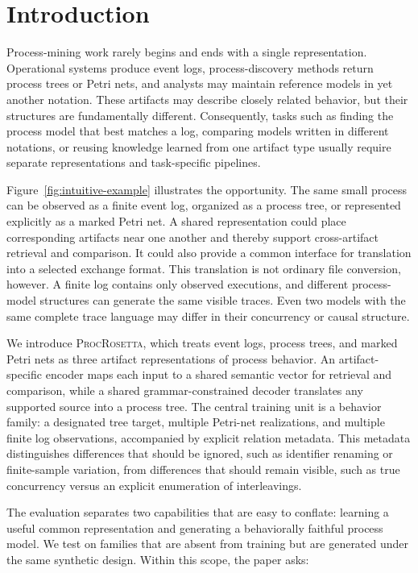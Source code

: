 \documentclass[pdflatex,sn-basic]{sn-jnl}
\newcommand{\model}{\textsc{ProcRosetta}\xspace}
\begin{document}
\section{Introduction}\label{sec:introduction}

Process-mining work rarely begins and ends with a single representation. Operational systems produce event logs, process-discovery methods return process trees or Petri nets, and analysts may maintain reference models in yet another notation. These artifacts may describe closely related behavior, but their structures are fundamentally different. Consequently, tasks such as finding the process model that best matches a log, comparing models written in different notations, or reusing knowledge learned from one artifact type usually require separate representations and task-specific pipelines.

Figure~\ref{fig:intuitive-example} illustrates the opportunity. The same small process can be observed as a finite event log, organized as a process tree, or represented explicitly as a marked Petri net. A shared representation could place corresponding artifacts near one another and thereby support cross-artifact retrieval and comparison. It could also provide a common interface for translation into a selected exchange format. This translation is not ordinary file conversion, however. A finite log contains only observed executions, and different process-model structures can generate the same visible traces. Even two models with the same complete trace language may differ in their concurrency or causal structure.



We introduce \model, which treats event logs, process trees, and marked Petri nets as three artifact representations of process behavior. An artifact-specific encoder maps each input to a shared semantic vector for retrieval and comparison, while a shared grammar-constrained decoder translates any supported source into a process tree. The central training unit is a behavior family: a designated tree target, multiple Petri-net realizations, and multiple finite log observations, accompanied by explicit relation metadata. This metadata distinguishes differences that should be ignored, such as identifier renaming or finite-sample variation, from differences that should remain visible, such as true concurrency versus an explicit enumeration of interleavings.

The evaluation separates two capabilities that are easy to conflate: learning a useful common representation and generating a behaviorally faithful process model. We test on families that are absent from training but are generated under the same synthetic design. Within this scope, the paper asks:
\end{document}
